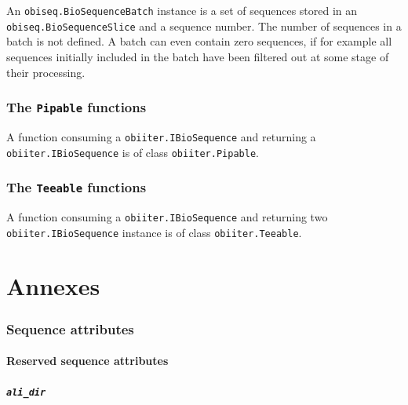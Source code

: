 \documentclass[
  letterpaper,
  DIV=11,
  numbers=noendperiod]{scrreprt}
\let\oldparagraph\paragraph
\renewcommand{\paragraph}[1]{\oldparagraph{#1}\mbox{}}
\begin{document}
An \texttt{obiseq.BioSequenceBatch} instance is a set of sequences
stored in an \texttt{obiseq.BioSequenceSlice} and a sequence number. The
number of sequences in a batch is not defined. A batch can even contain
zero sequences, if for example all sequences initially included in the
batch have been filtered out at some stage of their processing.

\hypertarget{the-pipable-functions}{%
\subsection*{\texorpdfstring{The \texttt{Pipable}
functions}{The Pipable functions}}\label{the-pipable-functions}}

A function consuming a \texttt{obiiter.IBioSequence} and returning a
\texttt{obiiter.IBioSequence} is of class \texttt{obiiter.Pipable}.

\hypertarget{the-teeable-functions}{%
\subsection*{\texorpdfstring{The \texttt{Teeable}
functions}{The Teeable functions}}\label{the-teeable-functions}}

A function consuming a \texttt{obiiter.IBioSequence} and returning two
\texttt{obiiter.IBioSequence} instance is of class
\texttt{obiiter.Teeable}.

\appendix
{}

\hypertarget{annexes}{%
\chapter{Annexes}\label{annexes}}

\hypertarget{sequence-attributes}{%
\subsection{Sequence attributes}\label{sequence-attributes}}

\hypertarget{reserved-sequence-attributes}{%
\subsubsection{Reserved sequence
attributes}\label{reserved-sequence-attributes}}

\hypertarget{ali_dir}{%
\paragraph{\texorpdfstring{\texttt{ali\_dir}}{ali\_dir}}\label{ali_dir}}
\end{document}
